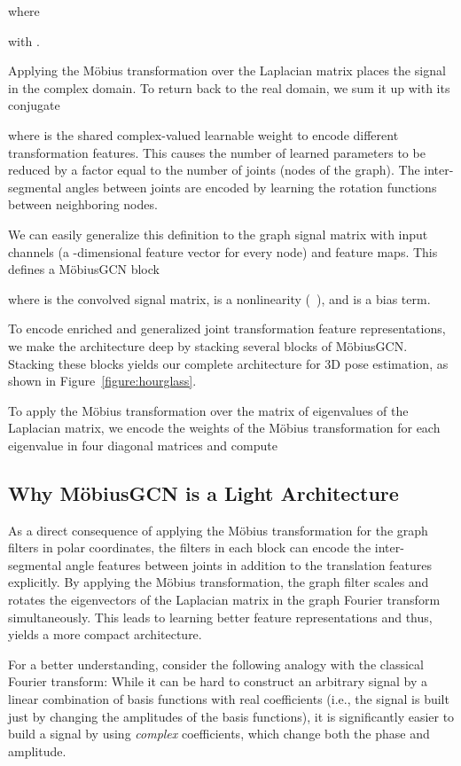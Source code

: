 \documentclass[runningheads]{llncs}
\begin{document}
where 

 with .

Applying the M\"obius transformation over the Laplacian matrix places the signal in the complex domain. To return back to the real domain, we sum it up with its conjugate

where  is the shared complex-valued learnable weight to encode different transformation features. This causes the number of learned parameters to be reduced by a factor equal to the number of joints (nodes of the graph). The inter-segmental angles between joints are encoded by learning the rotation functions between neighboring nodes. 

We can easily generalize this definition to the graph signal matrix  with  input channels (\ie a -dimensional feature vector for every node) and  feature maps. 
This defines a M\"obiusGCN block

where  is the convolved signal matrix,
 is a nonlinearity  (\eg {}~\cite{nair2010rectified}), and  is a bias term.

To encode enriched and generalized joint transformation feature representations, we make the architecture deep by stacking several blocks of M\"obiusGCN. Stacking these blocks yields our complete architecture for 3D pose estimation, as shown in Figure~\ref{figure:hourglass}.

To apply the M\"obius transformation over the matrix of eigenvalues of the Laplacian matrix, we encode the weights of the M\"obius transformation for each eigenvalue in four diagonal matrices  and compute


\subsection{Why M\"obiusGCN is a Light Architecture}
As a direct consequence of applying the M\"obius transformation for the graph filters in polar coordinates, the filters in each block can encode the inter-segmental angle features between joints in addition to the translation features explicitly. By applying the M\"obius transformation, the graph filter scales and rotates the eigenvectors of the Laplacian matrix in the graph Fourier transform simultaneously. This leads to learning better feature representations and thus, yields a more compact architecture.

For a better understanding, consider the following analogy with the classical Fourier transform: While it can be hard to construct an arbitrary signal by a linear combination of basis functions with real coefficients (i.e., the signal is built just by changing the amplitudes of the basis functions), it is significantly easier to build a signal by using {\em complex} coefficients, which change both the phase and amplitude.
\end{document}
